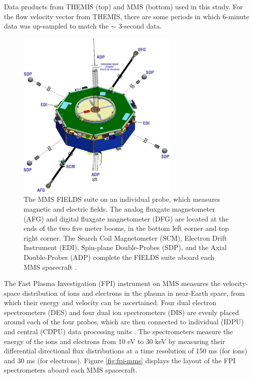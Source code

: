 \begin{table}
    \centering
    
    \caption[Data products from THEMIS and MMS]{Data products from THEMIS (top) and MMS (bottom) used in this study. For the flow velocity vector from THEMIS, there are some periods in which 6-minute data was up-sampled to match the $\sim$ 3-second data.}
    \label{tab:data-products}
\end{table}

\begin{figure}
    \centering
    \includegraphics[width=0.7\textwidth]{Figures/Instrumentation/Torbert_Figure7.png}
    \caption[MMS FIELDS suite]{The MMS FIELDS suite on an individual probe, which measures magnetic and electric fields. The analog fluxgate magnetometer (AFG) and digital fluxgate magnetometer (DFG) are located at the ends of the two five meter booms, in the bottom left corner and top right corner. The Search Coil Magnetometer (SCM),  Electron Drift Instrument (EDI), Spin-plane Double-Probes (SDP), and the Axial Double-Probes (ADP) complete the FIELDS suite aboard each MMS spacecraft \citep{Burch:2024}.}
    \label{fig:fgm-mms}
\end{figure}

The Fast Plasma Investigation (FPI) \citep{Pollock:2016} instrument on MMS measures the velocity-space distribution of ions and electrons in the plasma in near-Earth space, from which their energy and velocity can be ascertained. Four dual electron spectrometers (DES) and four dual ion spectrometers (DIS) are evenly placed around each of the four probes, which are then connected to individual (IDPU) and central (CDPU) data processing units \citep{Pollock:2016}. The spectrometers measure the energy of the ions and electrons from 10 eV to 30 keV by measuring their differential directional flux distributions at a time resolution of 150 ms (for ions) and 30 ms (for electrons). Figure \ref{fig:fpi-mms} displays the layout of the FPI spectrometers aboard each MMS spacecraft.

